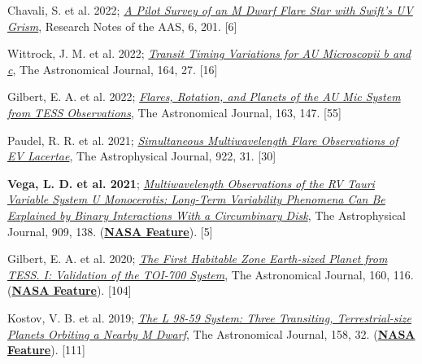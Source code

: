 \documentclass[12pt]{article}
\begin{document}
\begin{etaremune}
\item {Chavali, S. et al. 2022}; \href{https://ui.adsabs.harvard.edu/abs/2022RNAAS...6..201C/abstract}{\it A Pilot Survey of an M Dwarf Flare Star with Swift’s UV Grism}, Research Notes of the AAS, 6, 201. [6]

\item {Wittrock, J. M. et al. 2022}; \href{https://ui.adsabs.harvard.edu/abs/2022AJ....164...27W/abstract}{\it Transit Timing Variations for AU Microscopii b and c}, The Astronomical Journal, 164, 27. [16]

\item Gilbert, E. A. et al. 2022; \href{https://ui.adsabs.harvard.edu/abs/2022AJ....163..147G/abstract}{\it Flares, Rotation, and Planets of the AU Mic System from TESS Observations}, The Astronomical Journal, 163, 147. [55]

\item {Paudel, R. R. et al. 2021}; 
\href{https://ui.adsabs.harvard.edu/abs/2021ApJ...922...31P/abstract}{\it Simultaneous Multiwavelength Flare Observations of EV Lacertae}, The Astrophysical Journal, 922, 31. [30]

\item {\bf Vega, L. D. et al. 2021}; \href{https://ui.adsabs.harvard.edu/abs/2021ApJ...909..138V/abstract}{\it Multiwavelength Observations of the RV Tauri Variable System U Monocerotis: Long-Term Variability Phenomena Can Be Explained by Binary Interactions With a Circumbinary Disk}, The Astrophysical Journal, 909, 138. (\href{https://www.nasa.gov/feature/goddard/2021/scientists-sketch-aged-star-system-using-over-a-century-of-observations/}{\bf NASA Feature}). [5]

\item Gilbert, E. A. et al. 2020; \href{https://ui.adsabs.harvard.edu/abs/2020AJ....160..116G/abstract}{\it The First Habitable Zone Earth-sized Planet from TESS. I: Validation of the TOI-700 System}, The Astronomical Journal, 160, 116.
(\href{https://www.nasa.gov/feature/goddard/2020/nasa-planet-hunter-finds-its-1st-earth-size-habitable-zone-world}{\bf NASA Feature}). [104]

\item Kostov, V. B. et al. 2019; \href{https://ui.adsabs.harvard.edu/abs/2019AJ....158...32K/abstract}{{\it The L 98-59 System: Three Transiting, Terrestrial-size Planets Orbiting a Nearby M Dwarf}}, The Astronomical Journal, 158, 32.
(\href{https://www.nasa.gov/feature/goddard/2019/nasa-s-tess-mission-finds-its-smallest-planet-yet}{\bf NASA Feature}). [111]


\end{etaremune}
\end{document}
